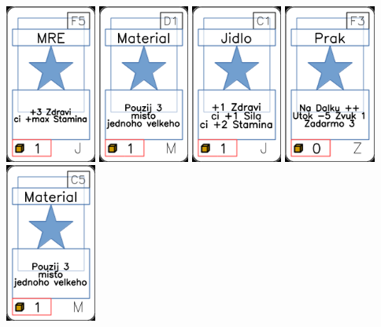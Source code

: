 \documentclass[a4paper]{article}
\begin{document}
	\includegraphics[width=3.0cm]{img-1_29}
	\includegraphics[width=3.0cm]{img-1_45}
	\includegraphics[width=3.0cm]{img-1_10}
	\includegraphics[width=3.0cm]{img-1_87}
	\includegraphics[width=3.0cm]{img-1_44}
\end{document}
